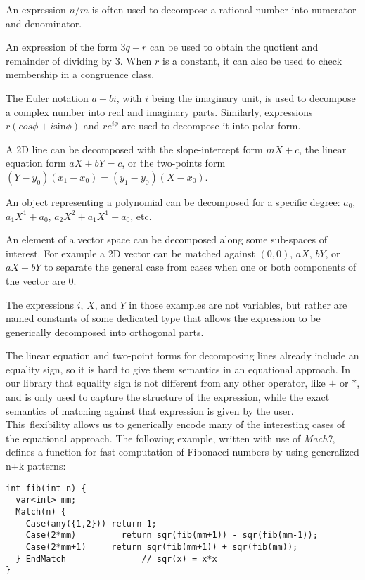 \begin{compactitem}
\setlength{\itemsep}{0pt}
\setlength{\parskip}{0pt}
\item An expression $n/m$ is often used to decompose a rational number into 
      numerator and denominator.
\item An expression of the form $3q + r$ can be used to obtain the quotient and 
      remainder of dividing by 3. When $r$ is a constant, it can also be used to
      check membership in a congruence class.
\item The Euler notation $a+bi$, with $i$ being the imaginary unit, is used to 
      decompose a complex number into real and imaginary parts. Similarly, 
      expressions $r(cos \phi + i\mathrm{sin} \phi)$ and $re^{i\phi}$ are used to 
      decompose it into polar form.
\item A 2D line can be decomposed with the slope-intercept form $mX+c$, the 
      linear equation form $aX+bY=c$, or the two-points form $(Y-y_0)(x_1-x_0)=(y_1-y_0)(X-x_0)$.
\item An object representing a polynomial can be decomposed for a specific degree: 
      $a_0$, $a_1X^1+a_0$, $a_2X^2+a_1X^1+a_0$, etc.
\item An element of a vector space can be decomposed along some sub-spaces of 
      interest. For example a 2D vector can be matched against $(0,0)$, $aX$, 
      $bY$, or $aX+bY$ to separate the general case from cases when one or both
      components of the vector are $0$.
\end{compactitem}

\noindent
The expressions $i$, $X$, and $Y$ in those examples are not variables, but rather are named 
constants of some dedicated type that allows the expression to be generically 
decomposed into orthogonal parts. 

The linear equation and two-point forms for decomposing lines already include 
an equality sign, so it is hard to give them semantics in an equational 
approach. In our library that equality sign is not different from any other 
operator, like $+$ or $*$, and is only used to capture the structure of the 
expression, while the exact semantics of matching against that expression is 
given by the user. This~flexibility allows us to generically encode many of the interesting cases 
of the equational approach. The following example, written with use of 
\emph{Mach7}, defines a function for fast computation of Fibonacci numbers by using 
generalized n+k patterns:

\begin{lstlisting}[keepspaces]
int fib(int n) {
  var<int> mm;
  Match(n) {
    Case(any({1,2})) return 1;     
    Case(2*mm)         return sqr(fib(mm+1)) - sqr(fib(mm-1));
    Case(2*mm+1)     return sqr(fib(mm+1)) + sqr(fib(mm));
  } EndMatch               // sqr(x) = x*x
}
\end{lstlisting}

